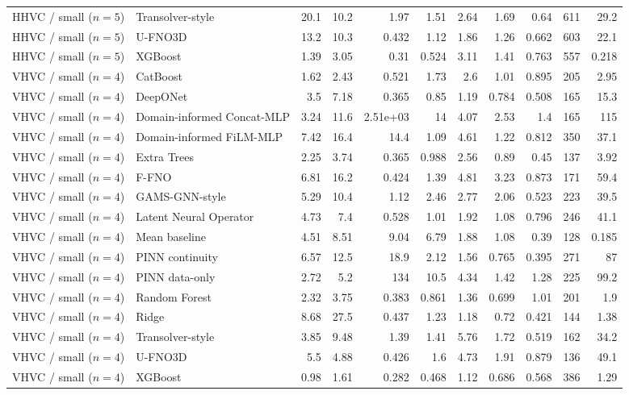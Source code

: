 \begin{landscape}
\begin{longtable}{p{2.8cm}p{3.6cm}rrrrrrrrr}
HHVC / small ($n=5$) & Transolver-style & 20.1 & 10.2 & 1.97 & 1.51 & 2.64 & 1.69 & 0.64 & 611 & 29.2 \\
HHVC / small ($n=5$) & U-FNO3D & 13.2 & 10.3 & 0.432 & 1.12 & 1.86 & 1.26 & 0.662 & 603 & 22.1 \\
HHVC / small ($n=5$) & XGBoost & 1.39 & 3.05 & 0.31 & 0.524 & 3.11 & 1.41 & 0.763 & 557 & 0.218 \\
VHVC / small ($n=4$) & CatBoost & 1.62 & 2.43 & 0.521 & 1.73 & 2.6 & 1.01 & 0.895 & 205 & 2.95 \\
VHVC / small ($n=4$) & DeepONet & 3.5 & 7.18 & 0.365 & 0.85 & 1.19 & 0.784 & 0.508 & 165 & 15.3 \\
VHVC / small ($n=4$) & Domain-informed Concat-MLP & 3.24 & 11.6 & 2.51e+03 & 14 & 4.07 & 2.53 & 1.4 & 165 & 115 \\
VHVC / small ($n=4$) & Domain-informed FiLM-MLP & 7.42 & 16.4 & 14.4 & 1.09 & 4.61 & 1.22 & 0.812 & 350 & 37.1 \\
VHVC / small ($n=4$) & Extra Trees & 2.25 & 3.74 & 0.365 & 0.988 & 2.56 & 0.89 & 0.45 & 137 & 3.92 \\
VHVC / small ($n=4$) & F-FNO & 6.81 & 16.2 & 0.424 & 1.39 & 4.81 & 3.23 & 0.873 & 171 & 59.4 \\
VHVC / small ($n=4$) & GAMS-GNN-style & 5.29 & 10.4 & 1.12 & 2.46 & 2.77 & 2.06 & 0.523 & 223 & 39.5 \\
VHVC / small ($n=4$) & Latent Neural Operator & 4.73 & 7.4 & 0.528 & 1.01 & 1.92 & 1.08 & 0.796 & 246 & 41.1 \\
VHVC / small ($n=4$) & Mean baseline & 4.51 & 8.51 & 9.04 & 6.79 & 1.88 & 1.08 & 0.39 & 128 & 0.185 \\
VHVC / small ($n=4$) & PINN continuity & 6.57 & 12.5 & 18.9 & 2.12 & 1.56 & 0.765 & 0.395 & 271 & 87 \\
VHVC / small ($n=4$) & PINN data-only & 2.72 & 5.2 & 134 & 10.5 & 4.34 & 1.42 & 1.28 & 225 & 99.2 \\
VHVC / small ($n=4$) & Random Forest & 2.32 & 3.75 & 0.383 & 0.861 & 1.36 & 0.699 & 1.01 & 201 & 1.9 \\
VHVC / small ($n=4$) & Ridge & 8.68 & 27.5 & 0.437 & 1.23 & 1.18 & 0.72 & 0.421 & 144 & 1.38 \\
VHVC / small ($n=4$) & Transolver-style & 3.85 & 9.48 & 1.39 & 1.41 & 5.76 & 1.72 & 0.519 & 162 & 34.2 \\
VHVC / small ($n=4$) & U-FNO3D & 5.5 & 4.88 & 0.426 & 1.6 & 4.73 & 1.91 & 0.879 & 136 & 49.1 \\
VHVC / small ($n=4$) & XGBoost & 0.98 & 1.61 & 0.282 & 0.468 & 1.12 & 0.686 & 0.568 & 386 & 1.29 \\

\end{longtable}
\end{landscape}
